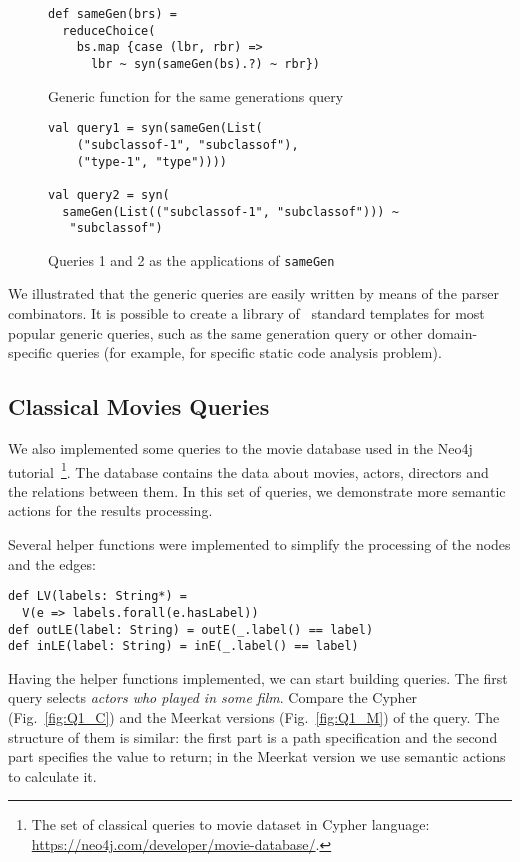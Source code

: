 \begin{figure}[h]
\begin{lstlisting}
def sameGen(brs) =
  reduceChoice(
    bs.map {case (lbr, rbr) =>
      lbr ~ syn(sameGen(bs).?) ~ rbr})
\end{lstlisting}
\caption{Generic function for the same generations query}
\label{fig:gen}
\end{figure}


\begin{figure}[h]
\begin{lstlisting}
val query1 = syn(sameGen(List(
    ("subclassof-1", "subclassof"),
    ("type-1", "type"))))

val query2 = syn(
  sameGen(List(("subclassof-1", "subclassof"))) ~
   "subclassof")
\end{lstlisting}
\caption{Queries 1 and 2 as the applications of \lstinline{sameGen}}
\label{fig:queryGen}
\end{figure}


We illustrated that the generic queries are easily written by means of the parser combinators.
It is possible to create a library of \ standard templates for most popular generic queries, such as the same generation query or other domain-specific queries (for example, for specific static code analysis problem).


\subsection{Classical Movies Queries}

We also implemented some queries to the movie database used in the Neo4j tutorial~\footnote{The set of classical queries to movie dataset in Cypher language: \url{https://neo4j.com/developer/movie-database/}.}.
The database contains the data about movies, actors, directors and the relations between them.
In this set of queries, we demonstrate more semantic actions for the results processing.

Several helper functions were implemented to simplify the processing of the nodes and the edges:

\begin{lstlisting}
def LV(labels: String*) =
  V(e => labels.forall(e.hasLabel))
def outLE(label: String) = outE(_.label() == label)
def inLE(label: String) = inE(_.label() == label)
\end{lstlisting}

Having the helper functions implemented, we can start building queries.
The first query selects \emph{actors who played in some film}.
Compare the Cypher (Fig.~\ref{fig:Q1_C}) and the Meerkat versions (Fig.~\ref{fig:Q1_M}) of the query.
The structure of them is similar: the first part is a path specification and the second part specifies the value to return; in the Meerkat version we use semantic actions to calculate it.

